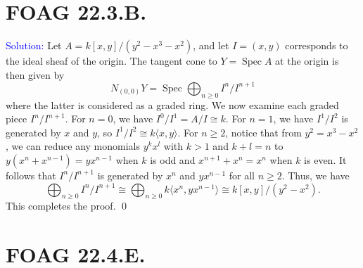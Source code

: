 \documentclass[11pt]{article}
\DeclareMathOperator{\Spec}{\operatorname{Spec}}
\newenvironment{solution}{\begin{trivlist}\item[]{\textcolor{blue}{Solution:}}}{\qed \end{trivlist}}
\begin{document}
\newpage

\section*{FOAG 22.3.B.}

\begin{solution}
    Let $A = k[x,y]/(y^2 - x^3 - x^2)$, and let $I = (x, y)$ corresponds to the ideal sheaf of the origin. The tangent cone to $Y = \Spec A$ at the origin is then given by 
    \[
        N_{(0,0)} Y = \Spec \bigoplus_{n \geq 0} I^n / I^{n+1}
    \]
    where the latter is considered as a graded ring. We now examine each graded piece $I^n / I^{n+1}$. For $n = 0$, we have $I^0 / I^1 = A / I \cong k$. For $n = 1$, we have $I^1 / I^2$ is generated by $x$ and $y$, so $I^1 / I^2 \cong k \langle x, y \rangle$. For $n \geq 2$, notice that from $y^2 = x^3 - x^2$, we can reduce any monomials $y^k x^l$ with $k > 1$ and $k + l = n$ to $y(x^n + x^{n-1}) = yx^{n-1}$ when $k$ is odd and $x^{n+1} + x^n = x^n$ when $k$ is even. It follows that $I^n / I^{n+1}$ is generated by $x^n$ and $y x^{n-1}$ for all $n \geq 2$. Thus, we have
    \[
        \bigoplus_{n \geq 0} I^n / I^{n+1}
        \cong \bigoplus_{n \geq 0} k \langle x^n, y x^{n-1} \rangle
        \cong k[x, y] / (y^2 - x^2). 
    \]
    This completes the proof.
\end{solution}

\newpage

\section*{FOAG 22.4.E.}
\end{document}

